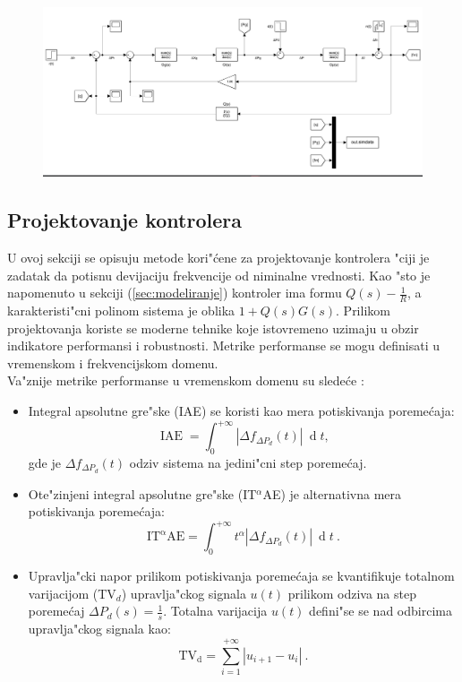 \documentclass[a4paper,11pt]{article}
\theoremstyle{definition} \newtheorem{deff}{Definicija}[section]
\theoremstyle{definition} \newtheorem{prim}[deff]{Primer}
\theoremstyle{plain} \newtheorem{teor}[deff]{Teorema}
\begin{document}
	\begin{figure}[!htb]
		\centering
		\includegraphics[width=.8\linewidth]{slike/model.png}
		\label{fig:model}
	\end{figure}
	
	\clearpage
	
	\subsection{Projektovanje kontrolera}\label{sec:projektovanje kont}
	
	U ovoj sekciji se opisuju metode kori"\'cene za projektovanje kontrolera "ciji je zadatak da potisnu devijaciju frekvencije od niminalne vrednosti. Kao "sto je napomenuto u sekciji (\ref{sec:modeliranje}) kontroler ima formu $Q(s) - \frac{1}{R}$, a karakteristi"cni polinom sistema je oblika $1+Q(s)G(s)$. Prilikom projektovanja koriste se moderne tehnike koje istovremeno uzimaju u obzir indikatore performansi i robustnosti. Metrike performanse se mogu definisati u vremenskom i frekvencijskom domenu.\\
	
	Va"znije metrike performanse u vremenskom domenu su slede\'ce \cite{inicijalna}: 
	\begin{itemize}
		\item Integral apsolutne gre"ske (IAE) se koristi kao mera potiskivanja poreme\'caja:
		\begin{equation}
			\operatorname{IAE} = \int_{0}^{+\infty}|\Delta f_{\Delta P_d}(t)|~\operatorname{d}t, 
		\end{equation}
		gde je $\Delta f_{\Delta P_d}(t)$ odziv sistema na jedini"cni step poreme\'caj. 
		
		\item Ote"zinjeni integral apsolutne gre"ske (IT$^\alpha$AE) je alternativna mera potiskivanja poreme\'caja:
		\begin{equation}
			\operatorname{IT^\alpha AE} = \int_{0}^{+\infty}t^\alpha|\Delta f_{\Delta P_d}(t)|~\operatorname{d}t~. 
		\end{equation}
			
		\item Upravlja"cki napor prilikom potiskivanja poreme\'caja se kvantifikuje totalnom varijacijom (TV$_d$) upravlja"ckog signala $u(t)$ prilikom odziva na step poreme\'caj $\Delta P_d(s) = \frac{1}{s}$. Totalna varijacija $u(t)$ defini"se se nad odbircima upravlja"ckog signala kao:
		\begin{equation}
			\operatorname{TV_d} = 
			\sum_{i = 1}^{+\infty} |u_{i+1} - u_i|~.
		\end{equation}
		
	\end{itemize}
	
\end{document}
